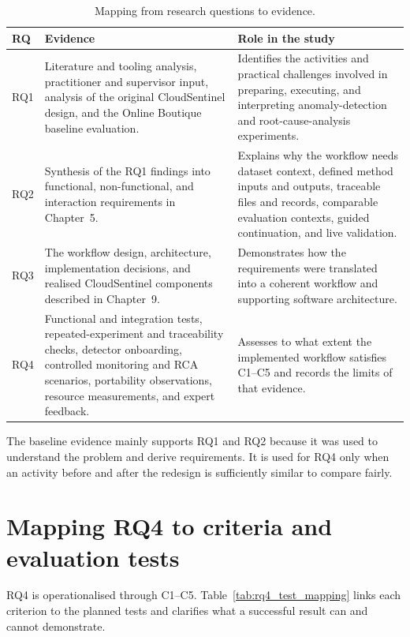 \begin{table}[H]
    \centering
    \caption{Mapping from research questions to evidence.}
    \label{tab:rq_evidence_mapping}
    \small
    \begin{tabular}{@{}p{} p{} p{}@{}}
        \toprule
        \textbf{RQ} & \textbf{Evidence} & \textbf{Role in the study} \\
        \midrule
        RQ1 & Literature and tooling analysis, practitioner and supervisor input, analysis of the original CloudSentinel design, and the Online Boutique baseline evaluation. & Identifies the activities and practical challenges involved in preparing, executing, and interpreting anomaly-detection and root-cause-analysis experiments. \\
        RQ2 & Synthesis of the RQ1 findings into functional, non-functional, and interaction requirements in Chapter~5. & Explains why the workflow needs dataset context, defined method inputs and outputs, traceable files and records, comparable evaluation contexts, guided continuation, and live validation. \\
        RQ3 & The workflow design, architecture, implementation decisions, and realised CloudSentinel components described in Chapter~9. & Demonstrates how the requirements were translated into a coherent workflow and supporting software architecture. \\
        RQ4 & Functional and integration tests, repeated-experiment and traceability checks, detector onboarding, controlled monitoring and RCA scenarios, portability observations, resource measurements, and expert feedback. & Assesses to what extent the implemented workflow satisfies C1--C5 and records the limits of that evidence. \\
        \bottomrule
    \end{tabular}
\end{table}

The baseline evidence mainly supports RQ1 and RQ2 because it was used to understand the problem and derive requirements. It is used for RQ4 only when an activity before and after the redesign is sufficiently similar to compare fairly.

\section{Mapping RQ4 to criteria and evaluation tests}
RQ4 is operationalised through C1--C5. Table~\ref{tab:rq4_test_mapping} links each criterion to the planned tests and clarifies what a successful result can and cannot demonstrate.

